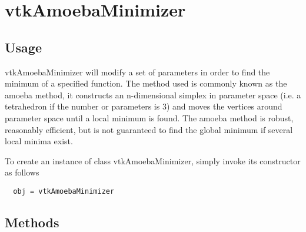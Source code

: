 \section{vtkAmoebaMinimizer}

\subsection{Usage}

 vtkAmoebaMinimizer will modify a set of parameters in order to find
 the minimum of a specified function.  The method used is commonly
 known as the amoeba method, it constructs an n-dimensional simplex
 in parameter space (i.e. a tetrahedron if the number or parameters
 is 3) and moves the vertices around parameter space until a local
 minimum is found.  The amoeba method is robust, reasonably efficient,
 but is not guaranteed to find the global minimum if several local
 minima exist.

To create an instance of class vtkAmoebaMinimizer, simply
invoke its constructor as follows
\begin{verbatim}
  obj = vtkAmoebaMinimizer
\end{verbatim}
\subsection{Methods}

